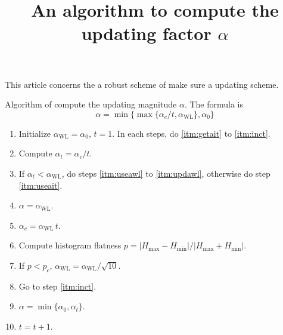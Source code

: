 \documentclass{article}
\begin{document}
\title{An algorithm to compute the updating factor $\alpha$}
\maketitle

This article concerns the a robust scheme of make sure a updating scheme.

Algorithm of compute the updating magnitude $\alpha$.
The formula is 
\[
\alpha = \min\{ \max\{\alpha_c/t, \alpha_{\mathrm{WL}} \}, \alpha_0 \}
\]

\begin{enumerate}
\item Initialize $\alpha_{\mathrm{WL}} = \alpha_0$, $t = 1$.
%
In each steps, do \ref{itm:getait} to \ref{itm:inct}.

\item \label{itm:getait} Compute $\alpha_t = \alpha_c/t$.

\item If $\alpha_t < \alpha_{\mathrm{WL}}$, 
      do steps \ref{itm:useawl} to \ref{itm:updawl},
      otherwise do step \ref{itm:useait}.

\item \label{itm:useawl} $\alpha = \alpha_{\mathrm{WL}}$.
\item $\alpha_c = \alpha_{\mathrm{WL}} \, t$.
\item Compute histogram flatness $p = |H_{\max} - H_{\min}| / |H_{\max} + H_{\min}|$.
\item \label{itm:updawl} If $p < p_c$, $\alpha_{\mathrm{WL}} = \alpha_{\mathrm{WL}} / \sqrt{10}$.
\item Go to step \ref{itm:inct}.

\item \label{itm:useait} $\alpha = \min\{\alpha_0, \alpha_t\}$. 

\item \label{itm:inct} $t = t + 1$. 
\end{enumerate} 
\end{document}
